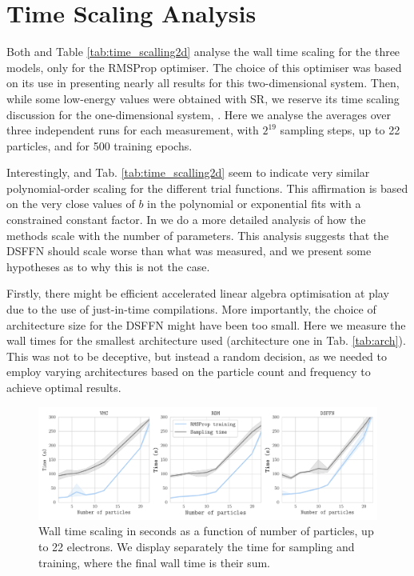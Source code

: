 
\section{Time Scaling Analysis}

Both  and Table \ref{tab:time_scalling2d} analyse the wall time scaling for the three models, only for the RMSProp optimiser. The choice of this optimiser was based on its use in presenting nearly all results for this two-dimensional system. Then, while some low-energy values were obtained with SR, we reserve its time scaling discussion for the one-dimensional system, . Here we analyse the averages over three independent runs for each measurement, with $2^{19}$ sampling steps, up to 22 particles, and for 500 training epochs.

Interestingly,  and Tab. \ref{tab:time_scalling2d} seem to indicate very similar polynomial-order scaling for the different trial functions. This affirmation is based on the very close values of $b$ in the polynomial or exponential fits with a constrained constant factor. In  we do a more detailed analysis of how the methods scale with the number of parameters. This analysis suggests that the DSFFN should scale worse than what was measured, and we present some hypotheses as to why this is not the case. 

Firstly, there might be efficient accelerated linear algebra optimisation at play due to the use of just-in-time compilations. More importantly, the choice of architecture size for the DSFFN might have been too small. Here we measure the wall times for the smallest architecture used (architecture one in Tab. \ref{tab:arch}). This was not to be deceptive, but instead a random decision, as we needed to employ varying architectures based on the particle count and frequency to achieve optimal results.

\begin{figure}[H]
    \centering
    \includegraphics[width=1\linewidth]{Chapters/Results/dots/time_scaling_2d.pdf}
    \caption{Wall time scaling in seconds as a function of number of particles, up to 22 electrons. We display separately the time for sampling and training, where the final wall time is their sum.}
    \label{fig:time_scalling2d}
\end{figure}

